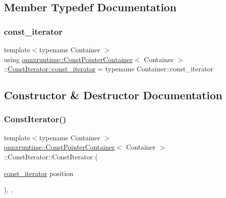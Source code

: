 \subsection{Member Typedef Documentation}
\mbox{\label{classonnxruntime_1_1ConstPointerContainer_1_1ConstIterator_a54fdc540cf44e6b2c2ec0b2478e52f10}} 
\subsubsection{\texorpdfstring{const\+\_\+iterator}{const\_iterator}}
{\footnotesize\ttfamily template$<$typename Container $>$ \\
using \mbox{\hyperlink{classonnxruntime_1_1ConstPointerContainer}{onnxruntime\+::\+Const\+Pointer\+Container}}$<$ Container $>$\+::\mbox{\hyperlink{classonnxruntime_1_1ConstPointerContainer_1_1ConstIterator_a54fdc540cf44e6b2c2ec0b2478e52f10}{Const\+Iterator\+::const\+\_\+iterator}} =  typename Container\+::const\+\_\+iterator}



\subsection{Constructor \& Destructor Documentation}
\mbox{\label{classonnxruntime_1_1ConstPointerContainer_1_1ConstIterator_a79c39a6fb33f40020a711f8b6b334038}} 
\subsubsection{\texorpdfstring{Const\+Iterator()}{ConstIterator()}}
{\footnotesize\ttfamily template$<$typename Container $>$ \\
\mbox{\hyperlink{classonnxruntime_1_1ConstPointerContainer}{onnxruntime\+::\+Const\+Pointer\+Container}}$<$ Container $>$\+::Const\+Iterator\+::\+Const\+Iterator (\begin{DoxyParamCaption}\item[{\mbox{\hyperlink{classonnxruntime_1_1ConstPointerContainer_1_1ConstIterator_a54fdc540cf44e6b2c2ec0b2478e52f10}{const\+\_\+iterator}}}]{position }\end{DoxyParamCaption})\hspace{0.3cm}{\ttfamily [inline]}, {\ttfamily [explicit]}, {\ttfamily [noexcept]}}

